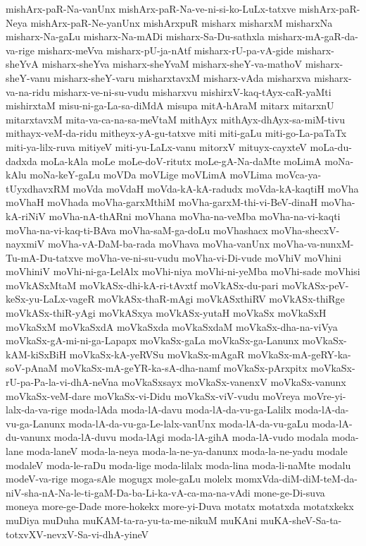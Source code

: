 {mishArx-paR-Na-vanUnx
mishArx-paR-Na-ve-ni-si-ko-LuLx-tatxve
mishArx-paR-Neya
mishArx-paR-Ne-yanUnx
mishArxpuR
misharx
misharxM
misharxNa
misharx-Na-gaLu
misharx-Na-mADi
misharx-Sa-Du-sathxla
misharx-mA-gaR-da-va-rige
misharx-meVva
misharx-pU-ja-nAtf
misharx-rU-pa-vA-gide
misharx-sheYvA
misharx-sheYva
misharx-sheYvaM
misharx-sheY-va-mathoV
misharx-sheY-vanu
misharx-sheY-varu
misharxtavxM
misharx-vAda
misharxva
misharx-va-na-ridu
misharx-ve-ni-su-vudu
misharxvu
mishirxV-kaq-tAyx-caR-yaMti
mishirxtaM
misu-ni-ga-La-sa-diMdA
misupa
mitA-hAraM
mitarx
mitarxnU
mitarxtavxM
mita-va-ca-na-sa-meVtaM
mithAyx
mithAyx-dhAyx-sa-miM-tivu
mithayx-veM-da-ridu
mitheyx-yA-gu-tatxve
miti
miti-gaLu
miti-go-La-paTaTx
miti-ya-lilx-ruva
mitiyeV
miti-yu-LaLx-vanu
mitorxV
mituyx-cayxteV
moLa-du-dadxda
moLa-kAla
moLe
moLe-doV-ritutx
moLe-gA-Na-daMte
moLimA
moNa-kAlu
moNa-keY-gaLu
moVDa
moVLige
moVLimA
moVLima
moVca-ya-tUyxdhavxRM
moVda
moVdaH
moVda-kA-kA-radudx
moVda-kA-kaqtiH
moVha
moVhaH
moVhada
moVha-garxMthiM
moVha-garxM-thi-vi-BeV-dinaH
moVha-kA-riNiV
moVha-nA-thARni
moVhana
moVha-na-veMba
moVha-na-vi-kaqti
moVha-na-vi-kaq-ti-BAva
moVha-saM-ga-doLu
moVhashacx
moVha-shecxV-nayxmiV
moVha-vA-DaM-ba-rada
moVhava
moVha-vanUnx
moVha-va-nunxM-Tu-mA-Du-tatxve
moVha-ve-ni-su-vudu
moVha-vi-Di-vude
moVhiV
moVhini
moVhiniV
moVhi-ni-ga-LelAlx
moVhi-niya
moVhi-ni-yeMba
moVhi-sade
moVhisi
moVkASxMtaM
moVkASx-dhi-kA-ri-tAvxtf
moVkASx-du-pari
moVkASx-peV-keSx-yu-LaLx-vageR
moVkASx-thaR-mAgi
moVkASxthiRV
moVkASx-thiRge
moVkASx-thiR-yAgi
moVkASxya
moVkASx-yutaH
moVkaSx
moVkaSxH
moVkaSxM
moVkaSxdA
moVkaSxda
moVkaSxdaM
moVkaSx-dha-na-viVya
moVkaSx-gA-mi-ni-ga-Lapapx
moVkaSx-gaLa
moVkaSx-ga-Lanunx
moVkaSx-kAM-kiSxBiH
moVkaSx-kA-yeRVSu
moVkaSx-mAgaR
moVkaSx-mA-geRY-ka-soV-pAnaM
moVkaSx-mA-geYR-ka-sA-dha-namf
moVkaSx-pArxpitx
moVkaSx-rU-pa-Pa-la-vi-dhA-neVna
moVkaSxsayx
moVkaSx-vanenxV
moVkaSx-vanunx
moVkaSx-veM-dare
moVkaSx-vi-Didu
moVkaSx-viV-vudu
moVreya
moVre-yi-lalx-da-va-rige
moda-lAda
moda-lA-davu
moda-lA-da-vu-ga-Lalilx
moda-lA-da-vu-ga-Lanunx
moda-lA-da-vu-ga-Le-lalx-vanUnx
moda-lA-da-vu-gaLu
moda-lA-du-vanunx
moda-lA-duvu
moda-lAgi
moda-lA-gihA
moda-lA-vudo
modala
moda-lane
moda-laneV
moda-la-neya
moda-la-ne-ya-danunx
moda-la-ne-yadu
modale
modaleV
moda-le-raDu
moda-lige
moda-lilalx
moda-lina
moda-li-naMte
modalu
modeV-va-rige
moga-sAle
mogugx
mole-gaLu
molelx
momxVda-diM-diM-teM-da-niV-sha-nA-Na-le-ti-gaM-Da-ba-Li-ka-vA-ca-ma-na-vAdi
mone-ge-Di-suva
moneya
more-ge-Dade
more-hokekx
more-yi-Duva
motatx
motatxda
motatxkekx
muDiya
muDuha
muKAM-ta-ra-yu-ta-me-nikuM
muKAni
muKA-sheV-Sa-ta-totxvXV-nevxV-Sa-vi-dhA-yineV
}
